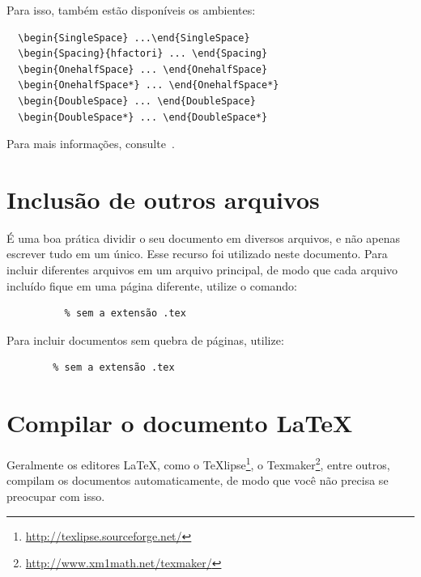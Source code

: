 Para isso, também estão disponíveis os ambientes:

\begin{verbatim}
  \begin{SingleSpace} ...\end{SingleSpace}
  \begin{Spacing}{hfactori} ... \end{Spacing}
  \begin{OnehalfSpace} ... \end{OnehalfSpace}
  \begin{OnehalfSpace*} ... \end{OnehalfSpace*}
  \begin{DoubleSpace} ... \end{DoubleSpace}
  \begin{DoubleSpace*} ... \end{DoubleSpace*}
\end{verbatim}

Para mais informações, consulte~.

\section{Inclusão de outros arquivos}%
\label{sec:include}

É uma boa prática dividir o seu documento em diversos arquivos, e não
apenas escrever tudo em um único. Esse recurso foi utilizado neste
documento. Para incluir diferentes arquivos em um arquivo principal,
de modo que cada arquivo incluído fique em uma página diferente, utilize o
comando:

\begin{verbatim}
          % sem a extensão .tex
\end{verbatim}

Para incluir documentos sem quebra de páginas, utilize:

\begin{verbatim}
        % sem a extensão .tex
\end{verbatim}

\section{Compilar o documento \LaTeX}

Geralmente os editores \LaTeX, como o
TeXlipse\footnote{\url{http://texlipse.sourceforge.net/}}, o
Texmaker\footnote{\url{http://www.xm1math.net/texmaker/}}, entre outros,
compilam os documentos automaticamente, de modo que você não precisa se
preocupar com isso.

